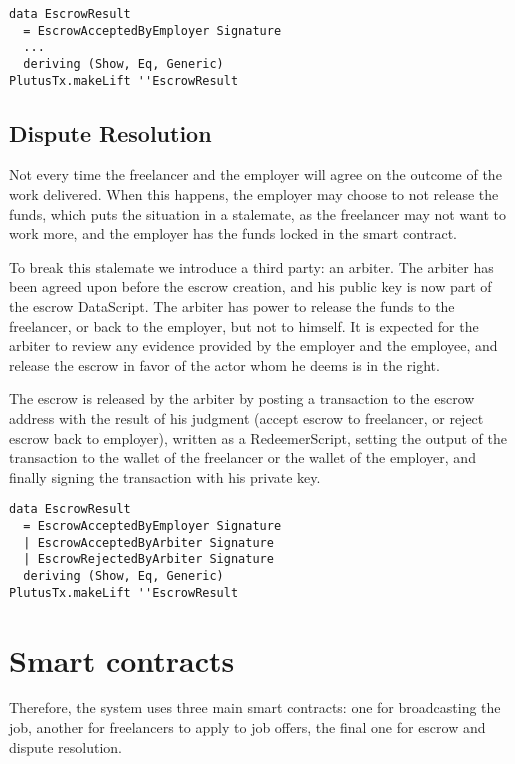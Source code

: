 \documentclass{article}
\begin{document}
\begin{samepage}
\begin{verbatim}
data EscrowResult
  = EscrowAcceptedByEmployer Signature
  ...
  deriving (Show, Eq, Generic)
PlutusTx.makeLift ''EscrowResult
\end{verbatim}
\end{samepage}


\subsection{Dispute Resolution}
Not every time the freelancer and the employer will agree on the outcome of the work delivered. When this happens, the employer may choose to not release the funds, which puts the situation in a stalemate, as the freelancer may not want to work more, and the employer has the funds locked in the smart contract.

To break this stalemate we introduce a third party: an arbiter. The arbiter has been agreed upon before the escrow creation, and his public key is now part of the escrow DataScript. The arbiter has power to release the funds to the freelancer, or back to the employer, but not to himself. It is expected for the arbiter to review any evidence provided by the employer and the employee, and release the escrow in favor of the actor whom he deems is in the right.

The escrow is released by the arbiter by posting a transaction to the escrow address with the result of his judgment (accept escrow to freelancer, or reject escrow back to employer), written as a RedeemerScript, setting the output of the transaction to the wallet of the freelancer or the wallet of the employer, and finally signing the transaction with his private key.

\begin{samepage}
\begin{verbatim}
data EscrowResult
  = EscrowAcceptedByEmployer Signature
  | EscrowAcceptedByArbiter Signature
  | EscrowRejectedByArbiter Signature
  deriving (Show, Eq, Generic)
PlutusTx.makeLift ''EscrowResult
\end{verbatim}
\end{samepage}

\section{Smart contracts}
Therefore, the system uses three main smart contracts: one for broadcasting the job, another for freelancers to apply to job offers, the final one for escrow and dispute resolution.
\end{document}
